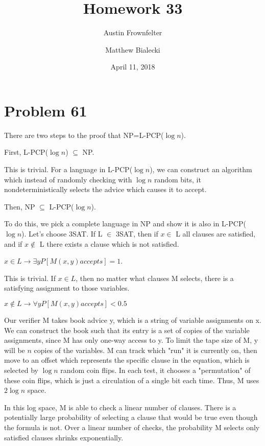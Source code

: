 \documentclass{article}
\title{Homework 33}
\author{Austin Frownfelter \and Matthew Bialecki}
\date{April 11, 2018}
\begin{document}
\maketitle

\section{Problem 61}

There are two steps to the proof that NP=L-PCP($\log n$).

\medskip
\noindent First, L-PCP($\log n$) $\subseteq$ NP.

This is trivial.  For a language in L-PCP($\log n$), we can construct an algorithm which instead of randomly checking with $\log n$ random bits, it nondeterministically selects the advice which causes it to accept.

\bigskip
\noindent Then, NP $\subseteq$ L-PCP($\log n$).

To do this, we pick a complete language in NP and show it is also in L-PCP($\log n$).  Let's choose 3SAT.  If L $\in$ 3SAT, then if $x\in $ L all clauses are satisfied, and if $x \notin$ L there exists a clause which is not satisfied.

\medskip
$x\in L \rightarrow \exists y P[M(x,y) accepts] = 1$.

This is trivial.  If $x \in L$, then no matter what clauses M selects, there is a satisfying assignment to those variables.

\medskip
$x\notin L \rightarrow \forall y P[M(x,y) accepts] < 0.5$

Our verifier M takes book advice y, which is a string of variable assignments on x.  We can construct the book such that its entry is a set of copies of the variable assignments, since M has only one-way access to y.  To limit the tape size of M, y will be $n$ copies of the variables.  M can track which "run" it is currently on, then move to an offset which represents the specific clause in the equation, which is selected by $\log n$ random coin flips.  In each test, it chooses a "permutation" of these coin flips, which is just a circulation of a single bit each time.  Thus, M uses $2 \log n$ space.

In this log space, M is able to check a linear number of clauses.  There is a potentially large probability of selecting a clause that would be true even though the formula is not.  Over a linear number of checks, the probability M selects only satisfied clauses shrinks exponentially.
\end{document}
